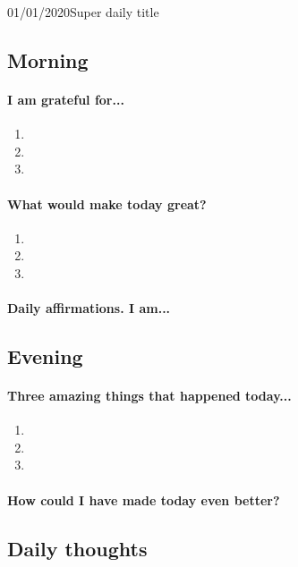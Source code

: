 \begin{loggentry}{01/01/2020}{Super daily title}

\subsection{Morning}

\paragraph{I am grateful for...}
\begin{enumerate}
  \item 
  \item 
  \item 
\end{enumerate}

\paragraph{What would make today great?}
\begin{enumerate}
  \item 
  \item 
  \item 
\end{enumerate}

\paragraph{Daily affirmations. I am...}


\subsection{Evening}

\paragraph{Three amazing things that happened today...}
\begin{enumerate}
  \item
  \item
  \item
\end{enumerate}

\paragraph{How could I have made today even better?}


\subsection{Daily thoughts}



\end{loggentry}
